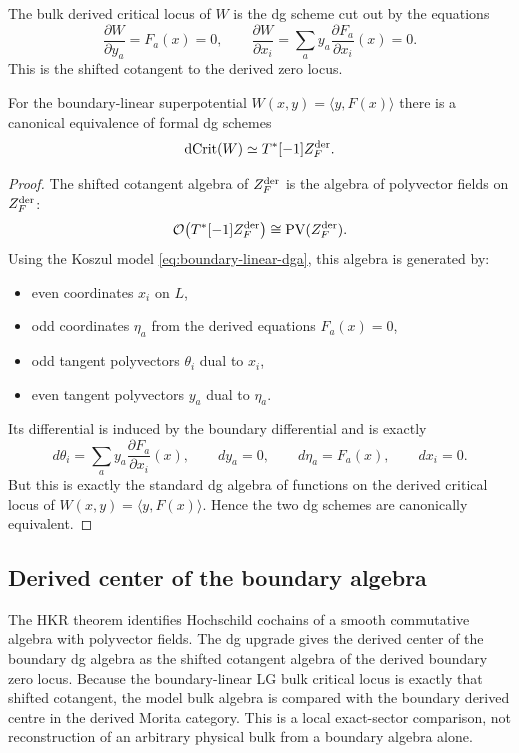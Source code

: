 The bulk derived critical locus of $W$ is the dg scheme cut out by the equations
\[
\frac{\partial W}{\partial y_a}=F_a(x)=0,
\qquad
\frac{\partial W}{\partial x_i}
=
\sum_a y_a\frac{\partial F_a}{\partial x_i}(x)=0.
\]
This is the shifted cotangent to the derived zero locus.

\begin{theorem}%
For the boundary-linear superpotential $W(x,y)=\langle y,F(x)\rangle$ there is a canonical equivalence of formal dg schemes
\[
\operatorname{dCrit}(W)\simeq T^*[-1] Z_F^{\mathrm{der}}.
\]
\end{theorem}

\begin{proof}
The shifted cotangent algebra of $Z_F^{\mathrm{der}}$ is the algebra of polyvector fields on $Z_F^{\mathrm{der}}$:
\[
\mathcal O\bigl(T^*[-1]Z_F^{\mathrm{der}}\bigr)\cong \operatorname{PV}(Z_F^{\mathrm{der}}).
\]
Using the Koszul model \eqref{eq:boundary-linear-dga}, this algebra is generated by:
\begin{itemize}[leftmargin=1.8em]
\item even coordinates $x_i$ on $L$,
\item odd coordinates $\eta_a$ from the derived equations $F_a(x)=0$,
\item odd tangent polyvectors $\theta_i$ dual to $x_i$,
\item even tangent polyvectors $y_a$ dual to $\eta_a$.
\end{itemize}
Its differential is induced by the boundary differential and is exactly
\[
d\theta_i
=
\sum_a y_a\frac{\partial F_a}{\partial x_i}(x),
\qquad
dy_a=0,
\qquad
d\eta_a=F_a(x),
\qquad
dx_i=0.
\]
But this is exactly the standard dg algebra of functions on the derived critical locus of $W(x,y)=\langle y,F(x)\rangle$. Hence the two dg schemes are canonically equivalent.
\end{proof}

\subsection{Derived center of the boundary algebra}

The HKR theorem identifies Hochschild cochains of a smooth commutative
algebra with polyvector fields. The dg upgrade gives the derived center
of the boundary dg algebra as the shifted cotangent algebra of the
derived boundary zero locus. Because the boundary-linear LG bulk
critical locus is exactly that shifted cotangent, the model bulk algebra
is compared with the boundary derived centre in the derived Morita
category. This is a local exact-sector comparison, not reconstruction
of an arbitrary physical bulk from a boundary algebra alone.

